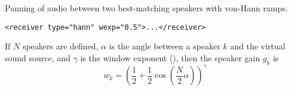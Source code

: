 Panning of audio between two best-matching speakers with von-Hann
ramps.

\begin{lstlisting}[numbers=none]
<receiver type="hann" wexp="0.5">...</receiver>
\end{lstlisting}
If $N$ speakers are defined, $\alpha$ is the angle between a speaker
$k$ and the virtual sound source, and $\gamma$ is the window exponent
(), then the speaker gain $g_k$ is
\begin{equation}
w_k = \left(\frac12 + \frac12 \cos\left(\frac{N}{2} \alpha\right)\right)^\gamma
\end{equation}


